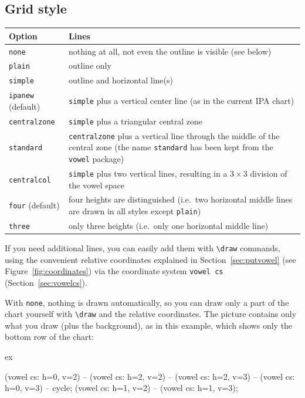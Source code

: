 \documentclass[a4paper,11pt]{article}
\newcommand\cmd[1]{\texttt{\textbackslash #1}}
\newcommand\opt[1]{\texttt{#1}}
\newcommand\pkg[1]{\texttt{#1}}
\begin{document}
\subsection{Grid style}
\label{sec:Grid}

\begin{center}
	\begin{tabular}{@{}p{2.5cm}p{13cm}@{}}
		\toprule
		Option & Lines\\
		\midrule
		\opt{none} & nothing at all, not even the outline is visible (see below)\\
		\opt{plain} & outline only\\
		\opt{simple} & outline and horizontal line(s) \\
		\opt{ipanew} (default) & \opt{simple} plus a vertical center line (as in the current IPA chart)\\
		\opt{centralzone} & \opt{simple} plus a triangular central zone \\
		\opt{standard} & \opt{centralzone} plus a vertical line through the middle of the central zone (the name \opt{standard} has been kept from the \pkg{vowel} package) \\
		\opt{centralcol} & \opt{simple} plus two vertical lines, resulting in a 3\,×\,3 division of the vowel space \\
		\midrule
		\opt{four} (default) & four heights are distinguished (i.e.\ two horizontal middle lines are drawn in all styles except \opt{plain}) \\
		\opt{three} & only three heights (i.e.\ only one horizontal middle line) \\
		\bottomrule
	\end{tabular}
\end{center}

\noindent
If you need additional lines, you can easily add them with \cmd{draw} commands, using the convenient relative coordinates explained in Section~\ref{sec:putvowel} (see Figure~\ref{fig:coordinates}) via the coordinate system \texttt{vowel cs} (Section~\ref{sec:vowelcs}).

With \opt{none}, nothing is drawn automatically, so you can draw only a part of the chart yourself with \cmd{draw} and the relative coordinates. The picture contains only what you draw (plus the background), as in this example, which shows only the bottom row of the chart:

\begin{tcblisting}{ex}
\begin{vowelchart}[none, width=6cm]
  \draw (vowel cs: h=0, v=2) -- (vowel cs: h=2, v=2) -- (vowel cs: h=2, v=3) -- (vowel cs: h=0, v=3) -- cycle;
  \draw (vowel cs: h=1, v=2) -- (vowel cs: h=1, v=3);
\end{vowelchart}
\end{tcblisting}
\end{document}
